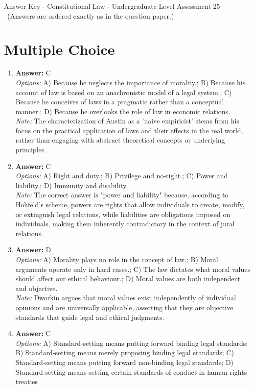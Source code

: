 \documentclass[12pt]{article}
\begin{document}
\begin{center}
Answer Key - Constitutional Law - Undergraduate Level Assessment 25 \
\small (Answers are ordered exactly as in the question paper.)
\end{center}

\section*{Multiple Choice}
\begin{enumerate}[label=\arabic*.]
\item \textbf{Answer:} C
\\ \textit{Options:} A) Because he neglects the importance of morality.; B) Because his account of law is based on an anachronistic model of a legal system.; C) Because he conceives of laws in a pragmatic rather than a conceptual manner.; D) Because he overlooks the role of law in economic relations.
\\ \textit{Note:} The characterization of Austin as a 'naive empiricist' stems from his focus on the practical application of laws and their effects in the real world, rather than engaging with abstract theoretical concepts or underlying principles.
\item \textbf{Answer:} C
\\ \textit{Options:} A) Right and duty.; B) Privilege and no-right.; C) Power and liability.; D) Immunity and disability.
\\ \textit{Note:} The correct answer is "power and liability" because, according to Hohfeld's scheme, powers are rights that allow individuals to create, modify, or extinguish legal relations, while liabilities are obligations imposed on individuals, making them inherently contradictory in the context of jural relations.
\item \textbf{Answer:} D
\\ \textit{Options:} A) Morality plays no role in the concept of law.; B) Moral arguments operate only in hard cases.; C) The law dictates what moral values should affect our ethical behaviour.; D) Moral values are both independent and objective.
\\ \textit{Note:} Dworkin argues that moral values exist independently of individual opinions and are universally applicable, asserting that they are objective standards that guide legal and ethical judgments.
\item \textbf{Answer:} C
\\ \textit{Options:} A) Standard-setting means putting forward binding legal standards; B) Standard-setting means merely proposing binding legal standards; C) Standard-setting means putting forward non-binding legal standards; D) Standard-setting means setting certain standards of conduct in human rights treaties

\end{enumerate}
\end{document}
